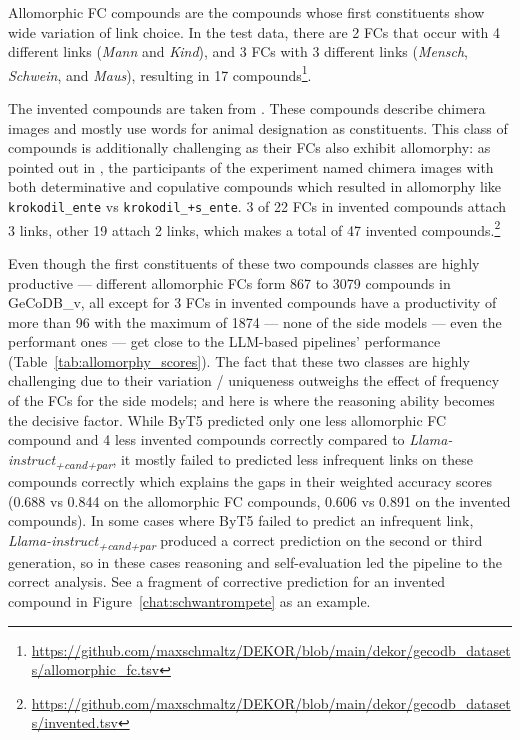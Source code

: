 \documentclass[11pt]{article}
\begin{document}
Allomorphic FC compounds are the compounds whose first constituents show wide variation of link choice. In the test data, there are 2 FCs that occur with 4 different links (\textit{Mann} and \textit{Kind}), and 3 FCs with 3 different links (\textit{Mensch}, \textit{Schwein}, and \textit{Maus}), resulting in 17 compounds\footnote{\url{https://github.com/maxschmaltz/DEKOR/blob/main/dekor/gecodb_datasets/allomorphic_fc.tsv}}.

The invented compounds are taken from \citet{NeefBorgwaldt+2012+27+56}. These compounds describe chimera images and mostly use words for animal designation as constituents. This class of compounds is additionally challenging as their FCs also exhibit allomorphy: as pointed out in \citet{NeefBorgwaldt+2012+27+56}, the participants of the experiment named chimera images with both determinative and copulative compounds which resulted in allomorphy like \texttt{krokodil\_ente} vs \texttt{krokodil\_+s\_ente}. 3 of 22 FCs in invented compounds attach 3 links, other 19 attach 2 links, which makes a total of 47 invented compounds.\footnote{\url{https://github.com/maxschmaltz/DEKOR/blob/main/dekor/gecodb_datasets/invented.tsv}}


Even though the first constituents of these two compounds classes are highly productive --- different allomorphic FCs form 867 to 3079 compounds in GeCoDB\_v, all except for 3 FCs in invented compounds have a productivity of more than 96 with the maximum of 1874 --- none of the side models --- even the performant ones --- get close to the LLM-based pipelines' performance (Table~\ref{tab:allomorphy_scores}). The fact that these two classes are highly challenging due to their variation / uniqueness outweighs the effect of frequency of the FCs for the side models; and here is where the reasoning ability becomes the decisive factor. While ByT5 predicted only one less allomorphic FC compound and 4 less invented compounds correctly compared to \textit{Llama-instruct\textsubscript{+cand+par}}, it mostly failed to predicted less infrequent links on these compounds correctly which explains the gaps in their weighted accuracy scores (0.688 vs 0.844 on the allomorphic FC compounds, 0.606 vs 0.891 on the invented compounds). In some cases where ByT5 failed to predict an infrequent link, \textit{Llama-instruct\textsubscript{+cand+par}} produced a correct prediction on the second or third generation, so in these cases reasoning and self-evaluation led the pipeline to the correct analysis. See a fragment of corrective prediction for an invented compound in Figure~\ref{chat:schwantrompete} as an example. 
\end{document}
